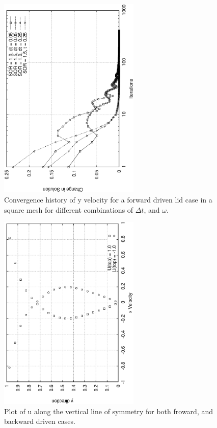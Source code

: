 \documentclass[a4paper, 10pt]{article}
\begin{document}
\begin{enumerate}[I]
    \begin{figure}
      \centering
      \includegraphics[width=0.6\textwidth, angle = -90]{../plot/basic/convergence/convV.eps}
      \caption{Convergence history of y velocity for a forward driven lid case in a square mesh for different combinations of $\Delta t$, and $\omega$.}
      \label{ch4}
    \end{figure}
    
    \begin{figure}
      \centering
      \includegraphics[width=0.6\textwidth, angle = -90]{../plot/basic/symmetry/uvel.eps}
      \caption{Plot of u along the vertical line of symmetry for both froward, and backward driven cases.}
      \label{uvel}
    \end{figure}
    

\end{enumerate}
\end{document}
